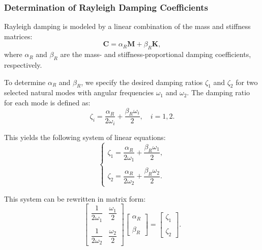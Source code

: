 \documentclass{article}
\begin{document}
	\subsubsection{Determination of Rayleigh Damping Coefficients}
	Rayleigh damping is modeled by a linear combination of the mass and stiffness matrices:
	\begin{equation}
		\mathbf{C} = \alpha_R \mathbf{M} + \beta_R \mathbf{K},
	\end{equation}
	where \( \alpha_R \) and \( \beta_R \) are the mass- and stiffness-proportional damping coefficients, respectively.
	
	To determine \( \alpha_R \) and \( \beta_R \), we specify the desired damping ratios \( \zeta_1 \) and \( \zeta_2 \) for two selected natural modes with angular frequencies \( \omega_1 \) and \( \omega_2 \). The damping ratio for each mode is defined as:
	\begin{equation}
		\zeta_i = \frac{\alpha_R}{2\omega_i} + \frac{\beta_R \omega_i}{2}, \quad i = 1, 2.
	\end{equation}
	
	This yields the following system of linear equations:
	\[
	\begin{cases}
		\zeta_1 = \dfrac{\alpha_R}{2\omega_1} + \dfrac{\beta_R \omega_1}{2}, \\\\
		\zeta_2 = \dfrac{\alpha_R}{2\omega_2} + \dfrac{\beta_R \omega_2}{2}.
	\end{cases}
	\]
	
	This system can be rewritten in matrix form:
	\begin{equation}
		\begin{bmatrix}
			\dfrac{1}{2\omega_1} & \dfrac{\omega_1}{2} \\\\
			\dfrac{1}{2\omega_2} & \dfrac{\omega_2}{2}
		\end{bmatrix}
		\begin{bmatrix}
			\alpha_R \\\\
			\beta_R
		\end{bmatrix}
		=
		\begin{bmatrix}
			\zeta_1 \\\\
			\zeta_2
		\end{bmatrix}.
	\end{equation}
	
\end{document}
